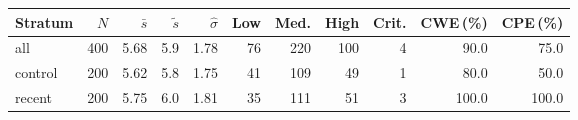 \begin{tabular}{lrrrrrrrrrr}
\toprule
Stratum & $N$ & $\bar s$ & $\tilde s$ & $\hat\sigma$ & Low & Med. & High & Crit. & CWE\,(\%) & CPE\,(\%) \\
\midrule
all & 400 & 5.68 & 5.9 & 1.78 & 76 & 220 & 100 & 4 & 90.0 & 75.0 \\
control & 200 & 5.62 & 5.8 & 1.75 & 41 & 109 & 49 & 1 & 80.0 & 50.0 \\
recent & 200 & 5.75 & 6.0 & 1.81 & 35 & 111 & 51 & 3 & 100.0 & 100.0 \\
\bottomrule
\end{tabular}

